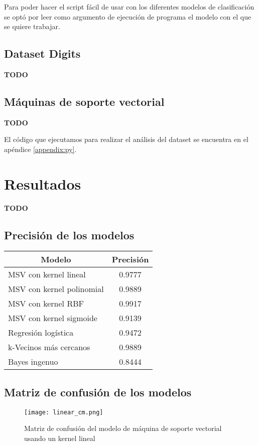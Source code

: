 \documentclass[sigconf,authorversion,nonacm]{acmart}
\begin{document}
Para poder hacer el script fácil de usar con los diferentes modelos de clasificación se optó por leer como argumento de ejecución de programa el modelo con el que se quiere trabajar.


\subsection{Dataset Digits}
\textbf{TODO}


\subsection{Máquinas de soporte vectorial}
\textbf{TODO}

El código que ejecutamos para realizar el análisis del dataset se encuentra en el apéndice \ref{appendix:py}.


\section{Resultados}
\textbf{TODO}

\subsection{Precisión de los modelos}
\begin{table}[H]
\begin{tabular}{|l|c|}
\hline
\multicolumn{1}{|c|}{\textbf{Modelo}} & \textbf{Precisión} \\ \hline
MSV con kernel lineal     & 0.9777    \\ \hline
MSV con kernel polinomial & 0.9889    \\ \hline
MSV con kernel RBF        & 0.9917    \\ \hline
MSV con kernel sigmoide   & 0.9139    \\ \hline
Regresión logística       & 0.9472    \\ \hline
k-Vecinos más cercanos    & 0.9889     \\ \hline
Bayes ingenuo             & 0.8444    \\ \hline
\end{tabular}
\end{table}

\subsection{Matriz de confusión de los modelos}
\begin{figure}[H]
  \centering
  \texttt{[image: linear\_cm.png]}
  \caption{Matriz de confusión del modelo de máquina de soporte vectorial usando un kernel lineal}
\end{figure}
\end{document}
